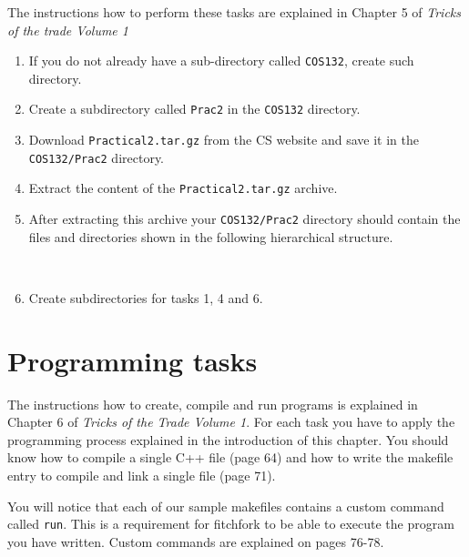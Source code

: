 \documentclass [a4paper,leqno, 12pt] {article}
\begin{document}
The instructions how to perform these tasks are explained in Chapter 5 of \textit{Tricks of the trade Volume 1} 
\begin{enumerate}
\item If you do not already have a sub-directory called \texttt{COS132}, create such directory.
\item Create a subdirectory called \texttt{Prac2} in the \texttt{COS132} directory.
\item Download \texttt{Practical2.tar.gz} from the CS website and save it in the \texttt{COS132/Prac2} directory.
\item Extract the content of the \texttt{Practical2.tar.gz} archive.
\newpage
\item After extracting this archive your \texttt{COS132/Prac2} directory should contain the files and directories shown in the following hierarchical structure. 
\end{enumerate}
\begin{minipage}[t]{0.1\textwidth}
~~
\end{minipage}
\begin{minipage}[t]{0.8\textwidth}
\end{minipage}

\begin{enumerate}
\setcounter{enumi}{5}
\item Create subdirectories for tasks 1, 4 and 6.
\end{enumerate}

\section{Programming tasks}

The instructions how to create, compile and run programs is explained in Chapter 6 of \textit{Tricks of the Trade Volume 1}. For each task you have to apply the programming process explained in the introduction of this chapter. You should know how to compile a single C++ file (page 64) and how to write the makefile entry to compile and link a single file (page 71). 

You will notice that each of our sample makefiles contains a custom command called \texttt{run}. This is a requirement for fitchfork to be able to execute the program you have written. Custom commands are explained on pages 76-78.
\end{document}
